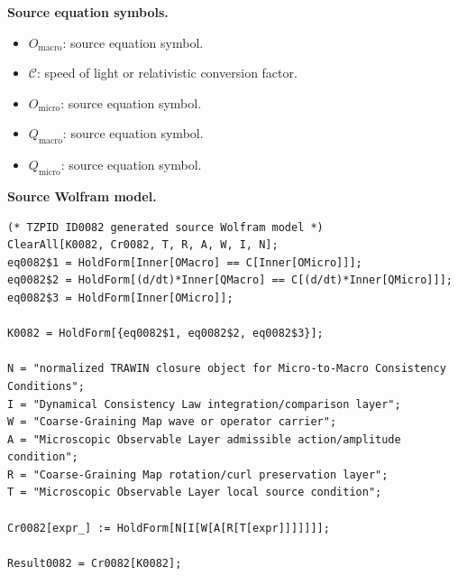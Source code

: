 \begin{minipage}[t]{0.49\linewidth}
\begingroup
\small
\raggedright
\textbf{Source equation symbols.}\par
\begin{itemize}[leftmargin=1.35em,itemsep=1pt,topsep=1pt,parsep=0pt]
    \item $O_{\mathrm{macro}}$: source equation symbol.
    \item $\mathcal{C}$: speed of light or relativistic conversion factor.
    \item $O_{\mathrm{micro}}$: source equation symbol.
    \item $Q_{\mathrm{macro}}$: source equation symbol.
    \item $Q_{\mathrm{micro}}$: source equation symbol.
\end{itemize}
\endgroup
\end{minipage}\hfill
\begin{minipage}[t]{0.47\linewidth}
\begingroup
\scriptsize
\raggedright
\textbf{Source Wolfram model.}\par
\begin{Verbatim}[fontsize=\tiny,breaklines=true,breakanywhere=true]
(* TZPID ID0082 generated source Wolfram model *)
ClearAll[K0082, Cr0082, T, R, A, W, I, N];
eq0082$1 = HoldForm[Inner[OMacro] == C[Inner[OMicro]]];
eq0082$2 = HoldForm[(d/dt)*Inner[QMacro] == C[(d/dt)*Inner[QMicro]]];
eq0082$3 = HoldForm[Inner[OMicro]];

K0082 = HoldForm[{eq0082$1, eq0082$2, eq0082$3}];

N = "normalized TRAWIN closure object for Micro-to-Macro Consistency Conditions";
I = "Dynamical Consistency Law integration/comparison layer";
W = "Coarse-Graining Map wave or operator carrier";
A = "Microscopic Observable Layer admissible action/amplitude condition";
R = "Coarse-Graining Map rotation/curl preservation layer";
T = "Microscopic Observable Layer local source condition";

Cr0082[expr_] := HoldForm[N[I[W[A[R[T[expr]]]]]]];

Result0082 = Cr0082[K0082];
\end{Verbatim}
\endgroup
\end{minipage}

